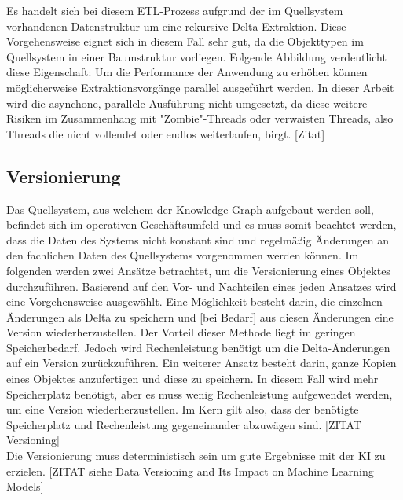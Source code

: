 Es handelt sich bei diesem ETL-Prozess aufgrund der im Quellsystem vorhandenen Datenstruktur um eine rekursive Delta-Extraktion. Diese Vorgehensweise eignet sich in diesem Fall sehr gut, da die Objekttypen im Quellsystem in einer Baumstruktur vorliegen. Folgende Abbildung verdeutlicht diese Eigenschaft:
Um die Performance der Anwendung zu erhöhen können möglicherweise Extraktionsvorgänge parallel ausgeführt werden. In dieser Arbeit wird die asynchone, parallele Ausführung nicht umgesetzt, da diese weitere Risiken im Zusammenhang mit "Zombie"-Threads oder verwaisten Threads, also Threads die nicht vollendet oder endlos weiterlaufen, birgt. [Zitat]
\subsection{Versionierung}
Das Quellsystem, aus welchem der Knowledge Graph aufgebaut werden soll, befindet sich im operativen Geschäftsumfeld und es muss somit beachtet werden, dass die Daten des Systems nicht konstant sind und regelmäßig Änderungen an den fachlichen Daten des Quellsystems vorgenommen werden können. Im folgenden werden zwei Ansätze betrachtet, um die Versionierung eines Objektes durchzuführen. Basierend auf den Vor- und Nachteilen eines jeden Ansatzes wird eine Vorgehensweise ausgewählt. Eine Möglichkeit besteht darin, die einzelnen Änderungen als Delta zu speichern und [bei Bedarf] aus diesen Änderungen eine Version wiederherzustellen. Der Vorteil dieser Methode liegt im geringen Speicherbedarf. Jedoch wird Rechenleistung benötigt um die Delta-Änderungen auf ein Version zurückzuführen. Ein weiterer Ansatz besteht darin, ganze Kopien eines Objektes anzufertigen und diese zu speichern. In diesem Fall wird mehr Speicherplatz benötigt, aber es muss wenig Rechenleistung aufgewendet werden, um eine Version wiederherzustellen. Im Kern gilt also, dass der benötigte Speicherplatz und Rechenleistung gegeneinander abzuwägen sind. [ZITAT Versioning] \\ 
Die Versionierung muss deterministisch sein um gute Ergebnisse mit der KI zu erzielen. [ZITAT siehe Data Versioning and Its Impact on Machine Learning Models] \\
